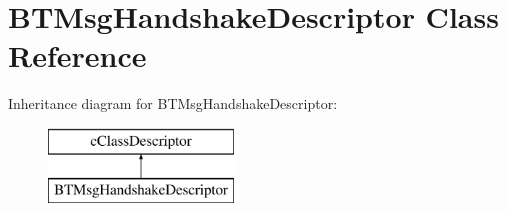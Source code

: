 \hypertarget{classBTMsgHandshakeDescriptor}{}\section{B\+T\+Msg\+Handshake\+Descriptor Class Reference}
\label{classBTMsgHandshakeDescriptor}
Inheritance diagram for B\+T\+Msg\+Handshake\+Descriptor\+:\begin{figure}[H]
\begin{center}
\leavevmode
\includegraphics[height=2.000000cm]{classBTMsgHandshakeDescriptor}
\end{center}
\end{figure}
